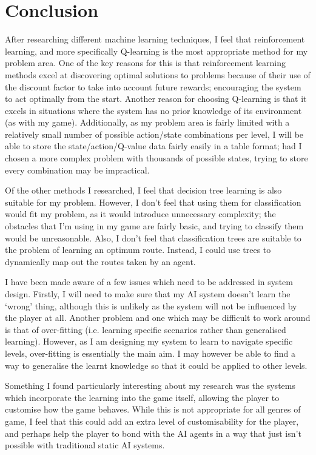 \documentclass[a4paper,oneside]{report}
\begin{document}
\section{Conclusion}

After researching different machine learning techniques, I feel that reinforcement learning, and more specifically Q-learning is the most appropriate method for my problem area. One of the key reasons for this is that reinforcement learning methods excel at discovering optimal solutions to problems because of their use of the discount factor to take into account future rewards; encouraging the system to act optimally from the start. Another reason for choosing Q-learning is that it excels in situations where the system has no prior knowledge of its environment (as with my game). Additionally, as my problem area is fairly limited with a relatively small number of possible action/state combinations per level, I will be able to store the state/action/Q-value data fairly easily in a table format; had I chosen a more complex problem with thousands of possible states, trying to store every combination may be impractical.

Of the other methods I researched, I feel that decision tree learning is also suitable for my problem. However, I don't feel that using them for classification would fit my problem, as it would introduce unnecessary complexity; the obstacles that I'm using in my game are fairly basic, and trying to classify them would be unreasonable. Also, I don't feel that classification trees are suitable to the problem of learning an optimum route. Instead, I could use trees to dynamically map out the routes taken by an agent.

I have been made aware of a few issues which need to be addressed in system design. Firstly, I will need to make sure that my AI system doesn't learn the `wrong' thing, although this is unlikely as the system will not be influenced by the player at all. Another problem and one which may be difficult to work around is that of over-fitting (i.e. learning specific scenarios rather than generalised learning). However, as I am designing my system to learn to navigate specific levels, over-fitting is essentially the main aim. I may however be able to find a way to generalise the learnt knowledge so that it could be applied to other levels. 

Something I found particularly interesting about my research was the systems which incorporate the learning into the game itself, allowing the player to customise how the game behaves. While this is not appropriate for all genres of game, I feel that this could add an extra level of customisability for the player, and perhaps help the player to bond with the AI agents in a way that just isn't possible with traditional static AI systems.
\end{document}
